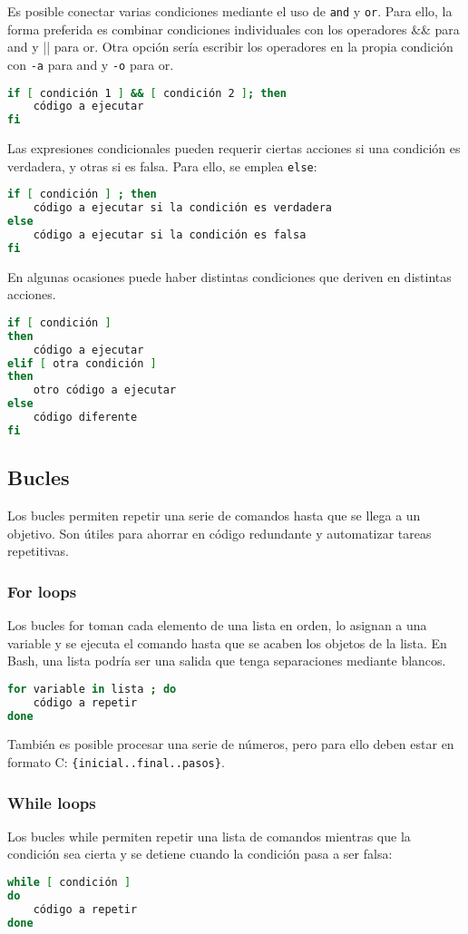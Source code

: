 Es posible conectar varias condiciones mediante el uso de \texttt{and} y \texttt{or}. Para ello, la forma preferida es combinar condiciones individuales con los operadores \&\& para and y || para or. Otra opción sería escribir los operadores en la propia condición con \texttt{-a} para and y \texttt{-o} para or. 
\begin{lstlisting}[language = bash]
if [ condición 1 ] && [ condición 2 ]; then
	código a ejecutar
fi
\end{lstlisting}

Las expresiones condicionales pueden requerir ciertas acciones si una condición es verdadera, y otras si es falsa. Para ello, se emplea \texttt{else}:
\begin{lstlisting}[language = bash]
if [ condición ] ; then
	código a ejecutar si la condición es verdadera
else
	código a ejecutar si la condición es falsa
fi
\end{lstlisting}

En algunas ocasiones puede haber distintas condiciones que deriven en distintas acciones.
\begin{lstlisting}[language = bash]
if [ condición ]
then
	código a ejecutar
elif [ otra condición ]
then
	otro código a ejecutar
else
	código diferente
fi
\end{lstlisting}

\subsection{Bucles}
Los bucles permiten repetir una serie de comandos hasta que se llega a un objetivo. Son útiles para ahorrar en código redundante y automatizar tareas repetitivas. 
\subsubsection{For loops}
Los bucles for toman cada elemento de una lista en orden, lo asignan a una variable y se ejecuta el comando hasta que se acaben los objetos de la lista. En Bash, una lista podría ser una salida que tenga separaciones mediante blancos.
\begin{lstlisting}[language = bash]
for variable in lista ; do
	código a repetir
done
\end{lstlisting}

También es posible procesar una serie de números, pero para ello deben estar en formato C: \texttt{\{inicial..final..pasos\}}.

\subsubsection{While loops}
Los bucles while permiten repetir una lista de comandos mientras que la condición sea cierta y se detiene cuando la condición pasa a ser falsa:
\begin{lstlisting}[language = bash]
while [ condición ]
do
	código a repetir
done
\end{lstlisting}

